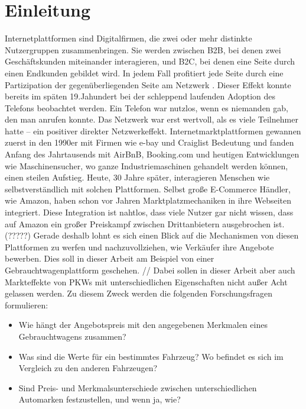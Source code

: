 \section{Einleitung}
Internetplattformen sind Digitalfirmen, die zwei oder mehr distinkte Nutzergruppen zusammenbringen. Sie werden zwischen B2B, bei denen zwei Geschäftskunden miteinander interagieren, und B2C, bei denen eine Seite durch einen Endkunden gebildet wird. In jedem Fall profitiert jede Seite durch eine Partizipation der gegenüberliegenden Seite am Netzwerk \cite{MUZELLEC2015139}. Dieser Effekt konnte bereits im späten 19.Jahundert bei der schleppend laufenden Adoption des Telefons beobachtet werden. Ein Telefon war nutzlos, wenn es niemanden gab, den man anrufen konnte. Das Netzwerk war erst wertvoll, als es viele Teilnehmer hatte – ein positiver direkter Netzwerkeffekt. \cite{evans2016matchmakers}
Internetmarktplattformen gewannen zuerst in den 1990er mit Firmen wie e-bay und Craiglist Bedeutung und fanden Anfang des Jahrtausends mit AirBnB, Booking.com und heutigen Entwicklungen wie Maschinensucher, wo ganze Industriemaschinen gehandelt werden können, einen steilen Aufstieg. Heute, 30 Jahre später, interagieren Menschen wie selbstverständlich mit solchen Plattformen. 
Selbst große E-Commerce Händler, wie Amazon, haben schon vor Jahren Marktplatzmechaniken in ihre Webseiten integriert. Diese Integration ist nahtlos, dass viele Nutzer gar nicht wissen, dass auf Amazon ein großer Preiskampf zwischen Drittanbietern ausgebrochen ist. (?????)
Gerade deshalb lohnt es sich einen Blick auf die Mechanismen von diesen Plattformen zu werfen und nachzuvollziehen, wie Verkäufer ihre Angebote bewerben.
Dies soll in dieser Arbeit am Beispiel von einer Gebrauchtwagenplattform geschehen. //
Dabei sollen in dieser Arbeit aber auch Markteffekte von PKWs mit unterschiedlichen Eigenschaften nicht außer Acht gelassen werden. Zu diesem Zweck werden die folgenden Forschungsfragen formulieren:

\begin{itemize}
    \item Wie hängt der Angebotspreis mit den angegebenen Merkmalen eines Gebrauchtwagens zusammen?
    \item Was sind die Werte für ein bestimmtes Fahrzeug? Wo befindet es sich im Vergleich zu den anderen Fahrzeugen? 
    \item Sind Preis- und Merkmalsunterschiede zwischen unterschiedlichen Automarken festzustellen, und wenn ja, wie?
\end{itemize}


